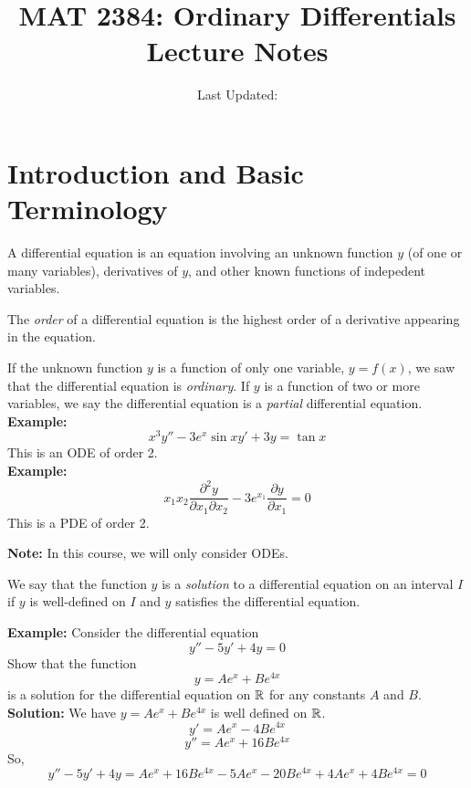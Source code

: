 \documentclass[openany]{report}
\title{MAT 2384: Ordinary Differentials Lecture Notes}
\author{Last Updated:}
\begin{document}
\maketitle

\tableofcontents
\setcounter{chapter}{-1}
\chapter{Introduction and Basic Terminology}
\begin{definition}
    A differential equation is an equation involving an unknown function $y$ (of one or many variables), derivatives of $y$, and other known functions of indepedent variables.
\end{definition}
\begin{definition}
    The \emph{order} of a differential equation is the highest order of a derivative appearing in the equation.
\end{definition}
If the unknown function $y$ is a function of only one variable, $y = f(x)$, we saw that the differential equation is \emph{ordinary}. If $y$ is a function of two or more variables, we say the differential equation is a \emph{partial} differential equation. \\[2ex]
\textbf{Example:}
\[x^3y'' - 3e^x \sin x y' + 3y = \tan x\]
This is an ODE of order 2. \\[2ex]
\textbf{Example:}
\[x_1x_2 \frac{\partial^2y}{\partial x_1\partial x_2} - 3e^{x_1} \frac{\partial y}{\partial x_1} = 0\]
This is a PDE of order 2. \\[2ex]
\begin{center}
    \textbf{Note:} In this course, we will only consider ODEs.
\end{center}
\begin{definition}
    We say that the function $y$ is a \emph{solution} to a differential equation on an interval $I$ if $y$ is well-defined on $I$ and $y$ satisfies the differential equation.
\end{definition}
\textbf{Example:} Consider the differential equation 
\[y'' - 5y' + 4y = 0\]
Show that the function 
\[y = Ae^x + Be^{4x}\]
is a solution for the differential equation on $\mathbb{R}$ for any constants $A$ and $B$. \\[2ex]
\textbf{Solution:} We have $y = Ae^x + Be^{4x}$ is well defined on $\mathbb{R}$. 
\[y' = Ae^x - 4Be^{4x}\]
\[y'' = Ae^x + 16Be^{4x}\]
So, 
    \[y'' - 5y' + 4y = Ae^x + 16Be^{4x} - 5Ae^x - 20Be^{4x} + 4Ae^x + 4Be^{4x} = 0\]
\end{document}
